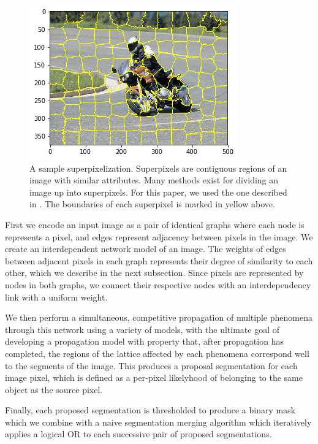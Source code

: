 \documentclass[twocolumn]{article}
\begin{document}
\begin{figure}[t!]
    \includegraphics[width=\linewidth]{figs/slic_zero.png}
    \caption{A sample superpixelization. Superpixels are contiguous regions of
    an image with similar attributes. Many methods exist for dividing an image
    up into superpixels. For this paper, we used the one described in
    \cite{achanta2010slic}. The boundaries of each superpixel is marked in
    yellow above.}
\end{figure}

First we encode an input image as a pair of identical graphs where each node is
represents a pixel, and edges represent adjacency between pixels in the image.
We create an interdependent network model of an image. The weights of
edges between adjacent pixels in each graph represents their degree of
similarity to each other, which we describe in the next subsection. Since pixels
are represented by nodes in both graphs, we connect their respective nodes with
an interdependency link with a uniform weight.

We then perform a simultaneous, competitive propagation of multiple
phenomena through this network using a variety of models, with the ultimate goal
of developing a propagation model with property that, after propagation has
completed, the regions of the lattice affected by each phenomena correspond well
to the segments of the image. This produces a proposal segmentation for each
image pixel, which is defined as a per-pixel likelyhood of belonging to the same
object as the source pixel.

Finally, each proposed segmentation is thresholded to produce a binary mask
which we combine with a naive segmentation merging algorithm which iteratively
applies a logical OR to each successive pair of proposed segmentations. 
\end{document}
